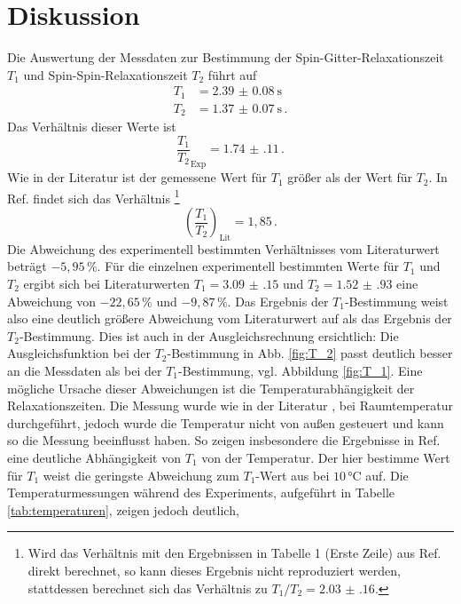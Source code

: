 \section{Diskussion}
Die Auswertung der Messdaten zur Bestimmung der Spin-Gitter-Relaxationszeit $T_1$ und Spin-Spin-Relaxationszeit 
$T_2$ führt auf
\begin{align*}
    T_1 &= \SI{2.39(8)}{\second} \\
    T_2 &= \SI{1.37(7)}{\second} \, .
\end{align*}
Das Verhältnis dieser Werte ist 
\begin{equation*}
    \frac{T_1}{T_2}_\text{Exp} = \num{1.74(11)} \, .
\end{equation*}
Wie in der Literatur \cite{MGL} ist der gemessene Wert für $T_1$ größer als der Wert für $T_2$.
In Ref. \cite{Chang} findet sich das Verhältnis 
\footnote[1]{Wird das Verhältnis mit den Ergebnissen in Tabelle 1 (Erste Zeile) aus Ref. \cite{Chang}
direkt berechnet, so kann dieses Ergebnis nicht reproduziert werden, stattdessen berechnet sich das Verhältnis
zu $T_1 / T_2 = \num{2.03(16)}$.}
\begin{equation*}
    \left(\frac{T_1}{T_2}\right)_\text{Lit} =1,85 \, .
\end{equation*}
Die Abweichung des experimentell bestimmten Verhältnisses vom Literaturwert beträgt $-5,95 \, \%$.
Für die einzelnen experimentell bestimmten Werte für $T_1$ und $T_2$ ergibt sich bei
Literaturwerten $T_1 = \num{3.09(15)}$ \cite{Chang} und 
$T_2 = \num{1.52(93)}$ \cite{Chang} eine Abweichung von $-22,65 \, \%$ und $-9,87 \, \%$. Das Ergebnis der 
$T_1$-Bestimmung weist also eine deutlich größere Abweichung vom Literaturwert auf als das Ergebnis der 
$T_2$-Bestimmung. Dies ist auch in der Ausgleichsrechnung ersichtlich: Die Ausgleichsfunktion bei der $T_2$-Bestimmung 
in Abb. \ref{fig:T_2} passt deutlich besser an die Messdaten als bei der $T_1$-Bestimmung, vgl. Abbildung \ref{fig:T_1}.
Eine mögliche Ursache dieser Abweichungen ist die Temperaturabhängigkeit der Relaxationszeiten. 
Die Messung wurde wie in der Literatur \cite{Chang}, \cite{MGL} bei Raumtemperatur
durchgeführt, jedoch wurde die Temperatur nicht von außen gesteuert und kann so die Messung beeinflusst haben.
So zeigen insbesondere die Ergebnisse in Ref. \cite{Krynicki} eine deutliche Abhängigkeit von $T_1$ von der
Temperatur. Der hier bestimme Wert für $T_1$ weist die geringste Abweichung zum $T_1$-Wert aus \cite{Krynicki}
bei $10 \, \si{\celsius}$ auf. Die Temperaturmessungen während des Experiments, aufgeführt in Tabelle \ref{tab:temperaturen}, zeigen jedoch deutlich, 
